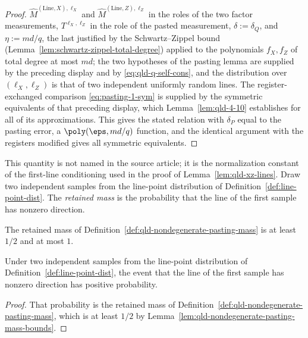 \begin{proof}
	$\hat{M}^{(\mathrm{Line},X),\ell_X}$ and
	$\hat{M}^{(\mathrm{Line},Z),\ell_Z}$ in the roles of the two factor
	measurements, $T^{\ell_X,\ell_Z}$ in the role of the pasted measurement,
	$\delta := \delta_Q$, and $\eta := md/q$, the last justified by the
	Schwartz--Zippel bound (Lemma~\ref{lem:schwartz-zippel-total-degree})
	applied to the polynomials $f_X, f_Z$ of total degree at most $md$; the
	two hypotheses of the pasting lemma are supplied by the preceding display
	and by \eqref{eq:qld-q-self-cons}, and the distribution over
	$(\ell_X, \ell_Z)$ is that of two independent uniformly random lines. The
	register-exchanged comparison \eqref{eq:pasting-1-sym} is supplied by the
	symmetric equivalents of that preceding display, which
	Lemma~\ref{lem:qld-4-10} establishes for all of its approximations.
	This gives the stated relation with $\delta_P$ equal to the pasting
	error, a $\poly(\eps, md/q)$ function, and the identical argument with
	the registers modified gives all symmetric equivalents.
\end{proof}

	\begin{definition}
		\label{def:qld-nondegenerate-pasting-mass}
		\leanok
		This quantity is not named in the source article; it is the normalization
		constant of the first-line conditioning used in the proof of
		Lemma~\ref{lem:qld-xz-lines}. Draw two independent samples from the
		line-point distribution of Definition~\ref{def:line-point-dist}. The
		\emph{retained mass} is the probability that the line of the first sample
		has nonzero direction.
	\end{definition}

	\begin{lemma}
		\label{lem:qld-nondegenerate-pasting-mass-bounds}
		\leanok
		The retained mass of Definition~\ref{def:qld-nondegenerate-pasting-mass} is
		at least $1/2$ and at most $1$.
	\end{lemma}

	\begin{lemma}
		\label{lem:qld-nondegenerate-pasting-mass-pos}
		\leanok
		Under two independent samples from the line-point distribution of
		Definition~\ref{def:line-point-dist}, the event that the line of the first
		sample has nonzero direction has positive probability.
	\end{lemma}
	\begin{proof}
		\leanok
		That probability is the retained mass of
		Definition~\ref{def:qld-nondegenerate-pasting-mass}, which is at least
		$1/2$ by Lemma~\ref{lem:qld-nondegenerate-pasting-mass-bounds}.
	\end{proof}

